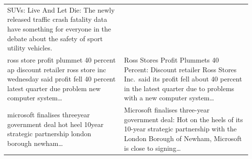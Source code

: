 \begin{table}[htbp]
\begin{tabular}{p{0.6\textheight} p{0.6\textheight}}
SUVs: Live And Let Die: The newly released traffic crash fatality data have something for everyone in the debate about the safety of sport utility vehicles. \\
\addlinespace
ross store profit plummet 40 percent ap discount retailer ross store inc wednesday said profit fell 40 percent latest quarter due problem new computer system\ldots &
Ross Stores Profit Plummets 40 Percent: Discount retailer Ross Stores Inc.\ said its profit fell about 40 percent in the latest quarter due to problems with a new computer system\ldots \\
\addlinespace
microsoft finalises threeyear government deal hot heel 10year strategic partnership london borough newham\ldots &
Microsoft finalises three-year government deal: Hot on the heels of its 10-year strategic partnership with the London Borough of Newham, Microsoft is close to signing\ldots \\
\bottomrule
\end{tabular}
\end{table}

